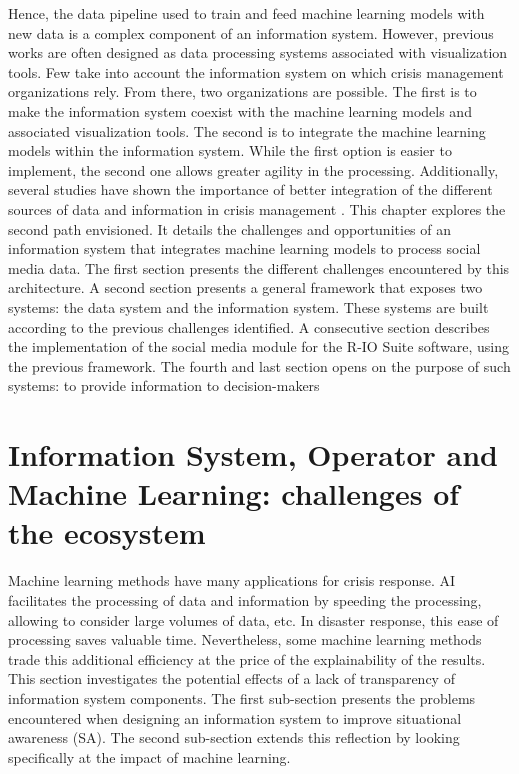 Hence, the data pipeline used to train and feed machine learning models with new data is a complex component of an information system.
However, previous works are often designed as data processing systems associated with visualization tools.
Few take into account the information system on which crisis management organizations rely.
From there, two organizations are possible.
The first is to make the information system coexist with the machine learning models and associated visualization tools.
The second is to integrate the machine learning models within the information system.
While the first option is easier to implement, the second one allows greater agility in the processing.
Additionally, several studies have shown the importance of better integration of the different sources of data and information in crisis management \parencite{comesBringingStructureDisaster2015,tapia2016scaling}.
This chapter explores the second path envisioned.
It details the challenges and opportunities of an information system that integrates machine learning models to process social media data.
The first section presents the different challenges encountered by this architecture.
A second section presents a general framework that exposes two systems: the data system and the information system.
These systems are built according to the previous challenges identified.
A consecutive section describes the implementation of the social media module for the R-IO Suite software, using the previous framework.
The fourth and last section opens on the purpose of such systems: to provide information to decision-makers

\section{Information System, Operator and Machine Learning: challenges of the ecosystem}
Machine learning methods have many applications for crisis response.
AI facilitates the processing of data and information by speeding the processing, allowing to consider large volumes of data, etc.
In disaster response, this ease of processing saves valuable time.
Nevertheless, some machine learning methods trade this additional efficiency at the price of the explainability of the results.
This section investigates the potential effects of a lack of transparency of information system components.
The first sub-section presents the problems encountered when designing an information system to improve situational awareness (SA).
The second sub-section extends this reflection by looking specifically at the impact of machine learning.

